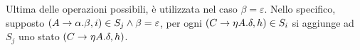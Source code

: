 \documentclass{subfiles}
\begin{document}
Ultima delle operazioni possibili, è utilizzata nel caso $\beta = \varepsilon$.
Nello specifico, supposto $(\Grammar{A}{\alpha . \beta}, i) \in S_{j} \land \beta = \varepsilon$, per ogni $(\Grammar{C}{\eta A. \delta}, h) \in S_{i}$
si aggiunge ad $S_{j}$ uno stato $(\Grammar{C}{\eta A. \delta}, h)$.
\end{document}

